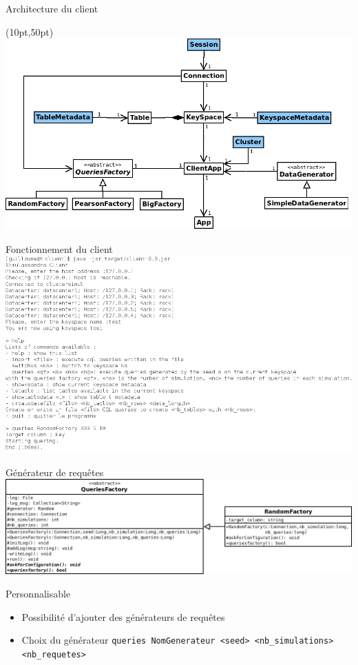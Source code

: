 \documentclass{beamer}
\begin{document}
\begin{frame}{Architecture du client}
\begin{textblock*}{\paperwidth}(10pt,50pt)
    \includegraphics[scale=0.4]{architecture_client}
\end{textblock*}
\end{frame}



\begin{frame}{Fonctionnement du client}
\centering
    \includegraphics[scale=0.40]{captureclient}
\end{frame}

\begin{frame}{Générateur de requêtes}
\centering
    \includegraphics[scale=0.3]{architecture_req}


  \begin{block}{Personnalisable}
   \begin{itemize}
    \item Possibilité d'ajouter des générateurs de requêtes
    \item Choix du générateur \newline \texttt{queries NomGenerateur <seed> <nb\_simulations> <nb\_requetes>}
   \end{itemize}
  \end{block}
\end{frame}
\end{document}
